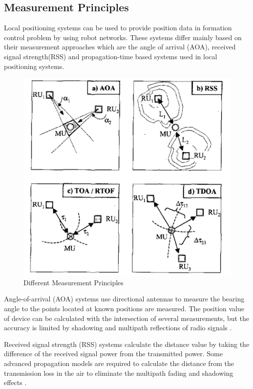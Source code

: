 \subsection{Measurement Principles} \label{sssec:num1}
Local positioning systems can be used to provide position data in formation control problem by using robot networks. These systems differ mainly based on their measurement approaches which are the angle of arrival (AOA), received signal strength(RSS) and propagation-time based systems used in local positioning systems. 

\begin{figure}[H]
	\caption{Different Measurement Principles \cite{20}}
	\centering
	\includegraphics[scale = 0.4]{measurement}
\end{figure} 

Angle-of-arrival (AOA) systems use directional antennas to measure the bearing angle to the points located at known positions are measured. The position value of device can be calculated with the intersection of several measurements, but the accuracy is limited by shadowing and multipath reflections of radio signals \cite{20}. 

Received signal strength (RSS) systems calculate the distance value by taking the difference of the received signal power from the transmitted power. Some advanced propagation models are required to calculate the distance from the transmission loss in the air to eliminate the multipath fading and shadowing effects \cite{21}. 

